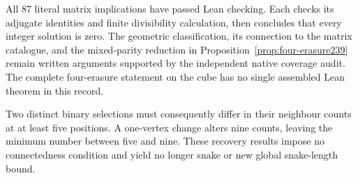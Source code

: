 All 87 literal matrix implications have passed Lean checking. Each
checks its adjugate identities and finite divisibility calculation,
then concludes that every integer solution is zero. The geometric
classification, its connection to the matrix catalogue, and the
mixed-parity reduction in Proposition~\ref{prop:four-erasure239} remain
written arguments supported by the independent native coverage audit.
The complete four-erasure statement on the cube has no single assembled
Lean theorem in this record.

Two distinct binary selections must consequently differ in their
neighbour counts at at least five positions. A one-vertex change alters
nine counts, leaving the minimum number between five and nine. These
recovery results impose no connectedness condition and yield no longer
snake or new global snake-length bound.
